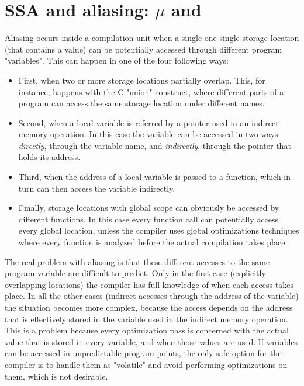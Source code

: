 \section{SSA and aliasing: $\mu$ and \chifuns}
\index{\mufun}\index{\chifun}
Aliasing occurs inside a compilation unit when a single one single storage location (that contains a value) can be potentially accessed through different program "variables".
This can happen in one of the four following ways:
\begin{itemize}
\item First, when two or more storage locations partially overlap. This, for instance, happens with the C "union" construct, where different parts of a program can access the same storage location under different names.
\item Second, when a local variable is referred by a pointer used in an indirect memory operation. In this case the variable can be accessed in two ways: {\em directly}, through the variable name, and {\em indirectly}, through the pointer that holds its address.
\item Third, when the address of a local variable is passed to a function, which in turn can then access the variable indirectly.
\item Finally, storage locations with global scope can obviously be accessed by different functions. In this case every function call can potentially access every global location, unless the compiler uses global optimizations techniques where every function is analyzed before the actual compilation takes place.
\end{itemize}

The real problem with aliasing is that these different accesses to the same program variable are difficult to predict. Only in the first case (explicitly overlapping locations) the compiler has full knowledge of when each access takes place. In all the other cases (indirect accesses through the address of the variable) the situation becomes more complex, because the access depends on the address that is effectively stored in the variable used in the indirect memory operation.
This is a problem because every optimization pass is concerned with the actual value that is stored in every variable, and when those values are used. If variables can be accessed in unpredictable program points, the only safe option for the compiler is to handle them as "volatile" and avoid performing optimizations on them, which is not desirable.

